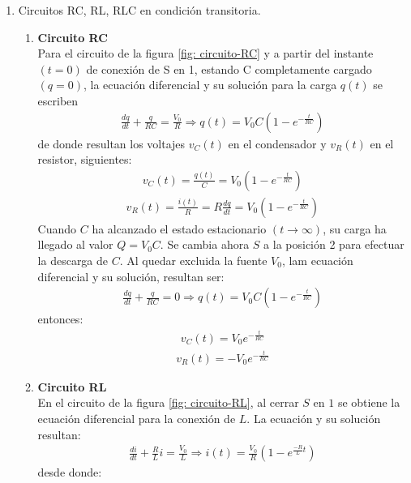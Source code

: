 \documentclass[]{article}
\begin{document}
\begin{enumerate}
      \item Circuitos RC, RL, RLC en condición transitoria.
      \begin{enumerate}
            \item \textbf{Circuito RC} \\
             Para el circuito de la figura \ref{fig: circuito-RC} y a partir del instante $(t = 0)$ de conexión de S en 1, estando C
             completamente cargado $(q = 0)$, la ecuación diferencial y su solución para la carga $q(t)$ se escriben
             \begin{align*}
                  \frac{dq}{dt} + \frac{q}{RC} = \frac{V_0}{R} \Rightarrow q(t) = V_0 C(1-e^{-\frac{t}{RC}})
             \end{align*}
            de donde resultan los voltajes $v_C(t)$ en el condensador y $v_R (t)$ en el resistor, siguientes:
            \begin{align*}
                  v_C(t) = \frac{q(t)}{C} = V_0 (1-e^{-\frac{t}{RC}})
            \end{align*}
            \begin{align*}
                  v_R(t) = \frac{i(t)}{R} = R \frac{dq}{dt} = V_0 (1-e^{-\frac{t}{RC}})
            \end{align*}
            Cuando $C$ ha alcanzado el estado estacionario $(t \rightarrow \infty )$, su carga ha llegado al valor
            $Q = V_0 C$. Se cambia ahora $S$ a la posición 2 para efectuar la descarga de $C$. Al quedar excluida la fuente
            $V_0$, lam ecuación diferencial y su solución, resultan ser:
            \begin{align*}
                  \frac{dq}{dt} + \frac{q}{RC} = 0 \Rightarrow q(t) = V_0 C(1-e^{-\frac{t}{RC}})
             \end{align*}
             entonces:
             \begin{align*}
                  v_C(t) =  V_0 e^{-\frac{t}{RC}}
            \end{align*}
            \begin{align*}
                  v_R(t) = - V_0 e^{-\frac{t}{RC}}
            \end{align*}
            
            \item \textbf{Circuito RL}\\
            En el circuito de la figura \ref{fig: circuito-RL}, al cerrar $S$ en $1$ se obtiene la ecuación diferencial para la conexión de $L$.
            La ecuación y su solución resultan: 
            \begin{align*}
                  \frac{di}{dt} + \frac{R}{L}i = \frac{V_0}{L} \Rightarrow i(t) = \frac{V_0}{R}(1-e^{\frac{-R}{L}t})
            \end{align*}
            desde donde:


\end{enumerate}
\end{enumerate}
\end{document}
